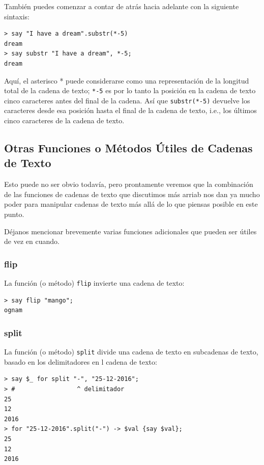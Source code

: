 También puedes comenzar a contar de atrás hacia adelante con la
siguiente sintaxis:

\begin{lstlisting}
> say "I have a dream".substr(*-5)
dream
> say substr "I have a dream", *-5;
dream
\end{lstlisting}
%
Aquí, el asterisco * puede considerarse como una representación de la
longitud total de la cadena de texto; \verb|*-5| es por lo tanto la posición
en la cadena de texto cinco caracteres antes del final de la cadena. Así que
\verb|substr(*-5)| devuelve los caracteres desde esa posición hasta el final
de la cadena de texto, i.e., los últimos cinco caracteres de la cadena de
texto.

\subsection{Otras Funciones o Métodos Útiles de Cadenas de Texto}

Esto puede no ser obvio todavía, pero prontamente veremos
que la combinación de las funciones de cadenas de texto que discutimos
más arriab nos dan ya mucho poder para manipular cadenas de texto
más allá de lo que piensas posible en este punto.

Déjanos mencionar brevemente varias funciones adicionales
que pueden ser útiles de vez en cuando.

\subsubsection{flip}

La función (o método) {\tt flip} invierte una cadena de texto:

\begin{lstlisting}
> say flip "mango";
ognam
\end{lstlisting}
%

\subsubsection{split}
La función (o método) {\tt split} divide una cadena de texto 
en subcadenas de texto, basado en los delimitadores en l
cadena de texto:

\begin{lstlisting}
> say $_ for split "-", "25-12-2016";
> #                 ^ delimitador
25
12
2016
> for "25-12-2016".split("-") -> $val {say $val};
25
12
2016
\end{lstlisting}

